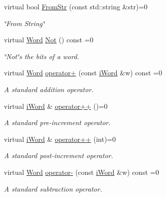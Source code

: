 \begin{DoxyCompactItemize}
virtual bool \hyperlink{classiWord_a6e40a4873ca945b119318a85c75a0fcf}{FromStr} (const std::string \&str)=0
\begin{DoxyCompactList}\small\item\em \char`\"{}From String\char`\"{} \item\end{DoxyCompactList}\item 
virtual \hyperlink{classWord}{Word} \hyperlink{classiWord_a6a7602a8220d84b5201a789b597fbbde}{Not} () const =0
\begin{DoxyCompactList}\small\item\em \char`\"{}Not\char`\"{}s the bits of a word. \item\end{DoxyCompactList}\item 
virtual \hyperlink{classWord}{Word} \hyperlink{classiWord_a146bf924df8cbb03fbe8152e5e44edbe}{operator+} (const \hyperlink{classiWord}{iWord} \&w) const =0
\begin{DoxyCompactList}\small\item\em A standard addition operator. \item\end{DoxyCompactList}\item 
virtual \hyperlink{classiWord}{iWord} \& \hyperlink{classiWord_af20040c25b79d2aeae41f1714fbb2cbc}{operator++} ()=0
\begin{DoxyCompactList}\small\item\em A standard pre-\/increment operator. \item\end{DoxyCompactList}\item 
virtual \hyperlink{classiWord}{iWord} \& \hyperlink{classiWord_a6777f6f41915179c4255d3647a9eb4b5}{operator++} (int)=0
\begin{DoxyCompactList}\small\item\em A standard post-\/increment operator. \item\end{DoxyCompactList}\item 
virtual \hyperlink{classWord}{Word} \hyperlink{classiWord_a8fbd3f879952196cca2e4f03bac3890b}{operator-\/} (const \hyperlink{classiWord}{iWord} \&w) const =0
\begin{DoxyCompactList}\small\item\em A standard subtraction operator. \item\end{DoxyCompactList}\item 

\end{DoxyCompactItemize}
